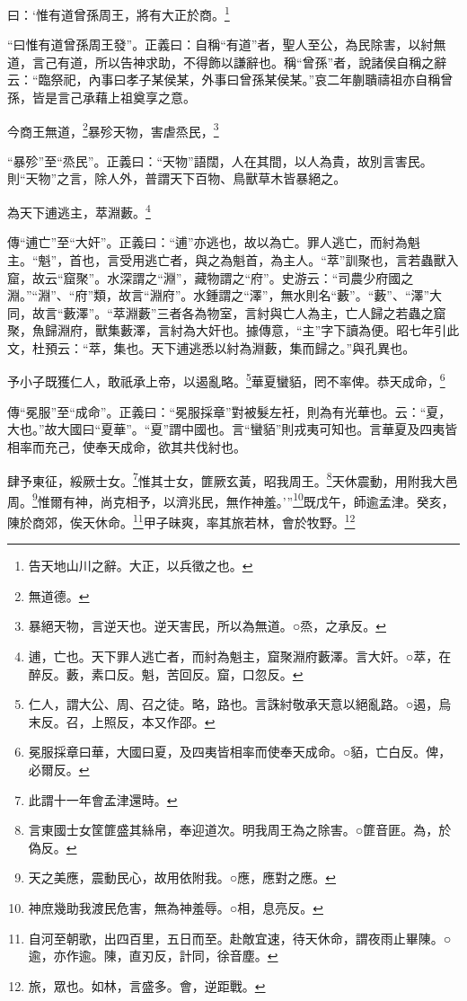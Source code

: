 曰：‘惟有道曾孫周王，將有大正於商。\footnote{告天地山川之辭。大正，以兵徵之也。}

{\noindent\shu{}\fzkt “曰惟有道曾孫周王發”。正義曰：自稱“有道”者，聖人至公，為民除害，以紂無道，言己有道，所以告神求助，不得飾以謙辭也。稱“曾孫”者，說諸侯自稱之辭云：“臨祭祀，內事曰孝子某侯某，外事曰曾孫某侯某。”哀二年蒯聵禱祖亦自稱曾孫，皆是言己承藉上祖奠享之意。 \par}

今商王無道，\footnote{無道德。}暴殄天物，害虐烝民，\footnote{暴絕天物，言逆天也。逆天害民，所以為無道。○烝，之承反。}

{\noindent\shu{}\fzkt “暴殄”至“烝民”。正義曰：“天物”語闊，人在其間，以人為貴，故別言害民。則“天物”之言，除人外，普謂天下百物、鳥獸草木皆暴絕之。 \par}

為天下逋逃主，萃淵藪。\footnote{逋，亡也。天下罪人逃亡者，而紂為魁主，窟聚淵府藪澤。言大奸。○萃，在醉反。藪，素口反。魁，苦回反。窟，口忽反。}

{\noindent\zhuan{}\fzbyks 傳“逋亡”至“大奸”。正義曰：“逋”亦逃也，故以為亡。罪人逃亡，而紂為魁主。“魁”，首也，言受用逃亡者，與之為魁首，為主人。“萃”訓聚也，言若蟲獸入窟，故云“窟聚”。水深謂之“淵”，藏物謂之“府”。史游云：“司農少府國之淵。”“淵”、“府”類，故言“淵府”。水鍾謂之“澤”，無水則名“藪”。“藪”、“澤”大同，故言“藪澤”。“萃淵藪”三者各為物室，言紂與亡人為主，亡人歸之若蟲之窟聚，魚歸淵府，獸集藪澤，言紂為大奸也。據傳意，“主”字下讀為便。昭七年引此文，杜預云：“萃，集也。天下逋逃悉以紂為淵藪，集而歸之。”與孔異也。 \par}

予小子既獲仁人，敢祇承上帝，以遏亂略。\footnote{仁人，謂大公、周、召之徒。略，路也。言誅紂敬承天意以絕亂路。○遏，烏末反。召，上照反，本又作邵。}華夏蠻貊，罔不率俾。恭天成命，\footnote{冕服採章曰華，大國曰夏，及四夷皆相率而使奉天成命。○貊，亡白反。俾，必爾反。}

{\noindent\zhuan{}\fzbyks 傳“冕服”至“成命”。正義曰：“冕服採章”對被髮左衽，則為有光華也。云：“夏，大也。”故大國曰“夏華”。“夏”謂中國也。言“蠻貊”則戎夷可知也。言華夏及四夷皆相率而充己，使奉天成命，欲其共伐紂也。 \par}

肆予東征，綏厥士女。\footnote{此謂十一年會孟津還時。}惟其士女，篚厥玄黃，昭我周王。\footnote{言東國士女筐篚盛其絲帛，奉迎道次。明我周王為之除害。○篚音匪。為，於偽反。}天休震動，用附我大邑周。\footnote{天之美應，震動民心，故用依附我。○應，應對之應。}惟爾有神，尚克相予，以濟兆民，無作神羞。’”\footnote{神庶幾助我渡民危害，無為神羞辱。○相，息亮反。}既戊午，師逾孟津。癸亥，陳於商郊，俟天休命。\footnote{自河至朝歌，出四百里，五日而至。赴敵宜速，待天休命，謂夜雨止畢陳。○逾，亦作逾。陳，直刃反，計同，徐音塵。}甲子昧爽，率其旅若林，會於牧野。\footnote{旅，眾也。如林，言盛多。會，逆距戰。}



